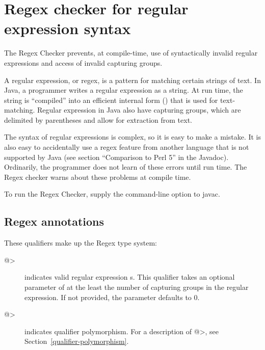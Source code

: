 \htmlhr
\chapter{Regex checker for regular expression syntax\label{regex-checker}}

The Regex Checker prevents, at compile-time, use of syntactically invalid
regular expressions and access of invalid capturing groups.

A regular expression, or regex, is a pattern for matching certain strings
of text.  In Java, a programmer writes a regular expression as a string.
At run time, the string is ``compiled'' into an efficient internal form
() that is used for
text-matching. Regular expression in Java also have capturing groups, which
are delimited by parentheses and allow for extraction from text.

The syntax of regular expressions is complex, so it is easy to make a
mistake.  It is also easy to accidentally use a regex feature from another
language that is not supported by Java (see section ``Comparison to Perl
5'' in the  Javadoc).
Ordinarily, the programmer does not learn of these errors until run time.
The Regex checker warns about these problems at compile time.

To run the Regex Checker, supply the  command-line option to javac.


\section{Regex annotations\label{regex-annotations}}

These qualifiers make up the Regex type system:

\begin{description}

\item[\<@>]
  indicates valid regular expression s. This qualifier takes
  an optional parameter of at the least the number of capturing groups in
  the regular expression. If not provided, the parameter defaults to 0.

\item[\<@>]
  indicates qualifier polymorphism. For a description of
  \<@>,
  see Section~\ref{qualifier-polymorphism}.

\end{description}

